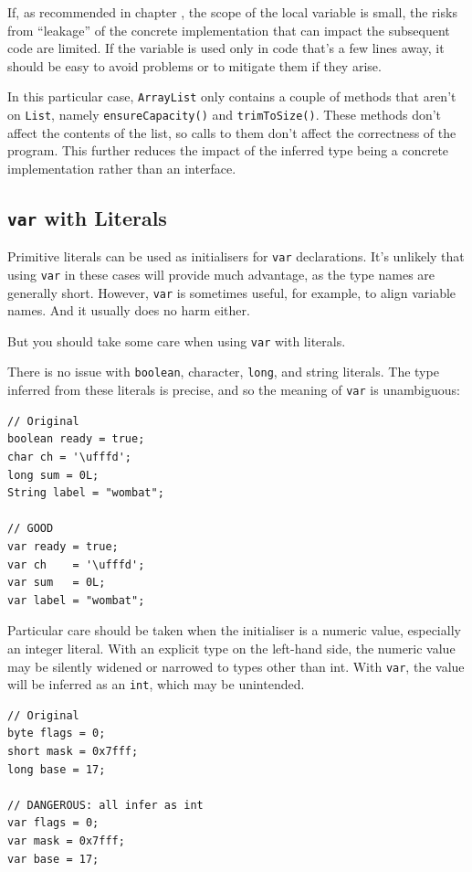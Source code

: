 If, as recommended in chapter , the scope of the local variable is small, the risks from “leakage” of the concrete implementation that can impact the subsequent code are limited. If the variable is used only in code that’s a few lines away, it should be easy to avoid problems or to mitigate them if they arise.

In this particular case, \lstinline|ArrayList| only contains a couple of methods that aren’t on \lstinline|List|, namely \lstinline|ensureCapacity()| and \lstinline|trimToSize()|. These methods don’t affect the contents of the list, so calls to them don’t affect the correctness of the program. This further reduces the impact of the inferred type being a concrete implementation rather than an interface.


\subsection{\lstinline|var| with Literals}
Primitive literals can be used as initialisers for \lstinline|var| declarations. It’s unlikely that using \lstinline|var| in these cases will provide much advantage, as the type names are generally short. However, \lstinline|var| is sometimes useful, for example, to align variable names. And it usually does no harm either.

But you should take some care when using \lstinline|var| with literals.

There is no issue with \lstinline|boolean|, character, \lstinline|long|, and string literals. The type inferred from these literals is precise, and so the meaning of \lstinline|var| is unambiguous:
\begin{lstlisting}
// Original
boolean ready = true;
char ch = '\ufffd';
long sum = 0L;
String label = "wombat";

// GOOD
var ready = true;
var ch    = '\ufffd';
var sum   = 0L;
var label = "wombat";
\end{lstlisting}

Particular care should be taken when the initialiser is a numeric value, especially an integer literal. With an explicit type on the left-hand side, the numeric value may be silently widened or narrowed to types other than int. With \lstinline|var|, the value will be inferred as an \lstinline|int|, which may be unintended.
\begin{lstlisting}
// Original
byte flags = 0;
short mask = 0x7fff;
long base = 17;

// DANGEROUS: all infer as int
var flags = 0;
var mask = 0x7fff;
var base = 17;
\end{lstlisting}

